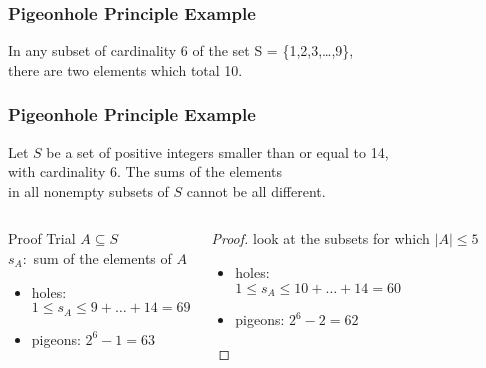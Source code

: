 \documentclass[dvipsnames]{beamer}
\begin{document}
\begin{frame}
  \frametitle{Pigeonhole Principle Example}

  \begin{theorem}
    In any subset of cardinality 6 of the set S = \{1,2,3,\dots,9\},\\
    there are two elements which total 10.
  \end{theorem}
\end{frame}

\begin{frame}
  \frametitle{Pigeonhole Principle Example}

  \begin{theorem}
    Let $S$ be a set of positive integers smaller than or equal to 14,\\
    with cardinality 6. The sums of the elements\\
    in all nonempty subsets of $S$ cannot be all different.
  \end{theorem}

  \pause
  \begin{columns}[t]
    \begin{block}{Proof Trial}
      $A \subseteq S$\\
      $s_A:$ sum of the elements of $A$

      \pause
      \begin{itemize}
        \item holes:\\
          $1 \leq s_A \leq 9 + \dots + 14 = 69$
        \item pigeons: $2^6 - 1 = 63$
      \end{itemize}
    \end{block}

    \pause
    \begin{proof}
      look at the subsets for which $|A| \leq 5$

      \pause
      \begin{itemize}
        \item holes:\\
          $1 \leq s_A \leq 10 + \dots + 14 = 60$
        \item pigeons: $2^6 - 2 = 62$
      \end{itemize}
    \end{proof}
  \end{columns}
\end{frame}
\end{document}
